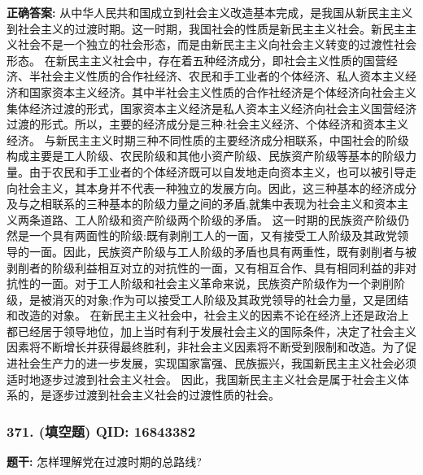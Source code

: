 \documentclass[12pt,UTF8]{ctexart}
\begin{document}
\textbf{正确答案:}
从中华人民共和国成立到社会主义改造基本完成，是我国从新民主主义到社会主义的过渡时期。这一时期，我国社会的性质是新民主主义社会。新民主主义社会不是一个独立的社会形态，而是由新民主主义向社会主义转变的过渡性社会形态。
在新民主主义社会中，存在着五种经济成分，即社会主义性质的国营经济、半社会主义性质的合作社经济、农民和手工业者的个体经济、私人资本主义经济和国家资本主义经济。其中半社会主义性质的合作社经济是个体经济向社会主义集体经济过渡的形式，国家资本主义经济是私人资本主义经济向社会主义国营经济过渡的形式。所以，主要的经济成分是三种:社会主义经济、个体经济和资本主义经济。
与新民主主义时期三种不同性质的主要经济成分相联系，中国社会的阶级构成主要是工人阶级、农民阶级和其他小资产阶级、民族资产阶级等基本的阶级力量。由于农民和手工业者的个体经济既可以自发地走向资本主义，也可以被引导走向社会主义，其本身并不代表一种独立的发展方向。因此，这三种基本的经济成分及与之相联系的三种基本的阶级力量之间的矛盾,就集中表现为社会主义和资本主义两条道路、工人阶级和资产阶级两个阶级的矛盾。
这一时期的民族资产阶级仍然是一个具有两面性的阶级:既有剥削工人的一面，又有接受工人阶级及其政党领导的一面。因此，民族资产阶级与工人阶级的矛盾也具有两重性，既有剥削者与被剥削者的阶级利益相互对立的对抗性的一面，又有相互合作、具有相同利益的非对抗性的一面。对于工人阶级和社会主义革命来说，民族资产阶级作为一个剥削阶级，是被消灭的对象;作为可以接受工人阶级及其政党领导的社会力量，又是团结和改造的对象。
在新民主主义社会中，社会主义的因素不论在经济上还是政治上都已经居于领导地位，加上当时有利于发展社会主义的国际条件，决定了社会主义因素将不断增长并获得最终胜利，非社会主义因素将不断受到限制和改造。为了促进社会生产力的进一步发展，实现国家富强、民族振兴，我国新民主主义社会必须适时地逐步过渡到社会主义社会。
因此，我国新民主主义社会是属于社会主义体系的，是逐步过渡到社会主义社会的过渡性质的社会。

\vspace{0.3em}\hrulefill\vspace{0.7em}

\subsubsection*{371. (填空题) \small QID: 16843382}

\textbf{题干:}
怎样理解党在过渡时期的总路线?
\end{document}
